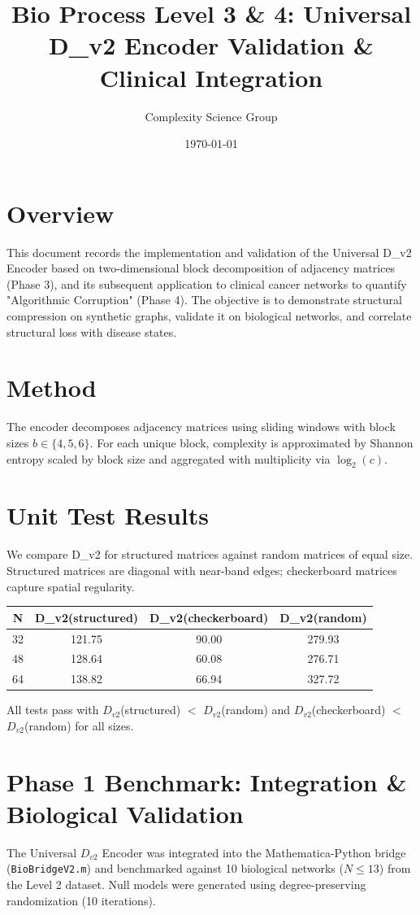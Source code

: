 \documentclass[11pt]{article}
\title{Bio Process Level 3 \& 4: Universal D\_v2 Encoder Validation \& Clinical Integration}
\author{Complexity Science Group}
\date{\today}
\begin{document}
\maketitle
\section*{Overview}
This document records the implementation and validation of the Universal D\_v2 Encoder based on two-dimensional block decomposition of adjacency matrices (Phase 3), and its subsequent application to clinical cancer networks to quantify "Algorithmic Corruption" (Phase 4). The objective is to demonstrate structural compression on synthetic graphs, validate it on biological networks, and correlate structural loss with disease states.

\section*{Method}
The encoder decomposes adjacency matrices using sliding windows with block sizes $b\in\{4,5,6\}$. For each unique block, complexity is approximated by Shannon entropy scaled by block size and aggregated with multiplicity via $\log_2(c)$.

\section*{Unit Test Results}
We compare D\_v2 for structured matrices against random matrices of equal size. Structured matrices are diagonal with near-band edges; checkerboard matrices capture spatial regularity.
\begin{center}
\begin{tabular}{cccc}
\toprule
N & D\_v2(structured) & D\_v2(checkerboard) & D\_v2(random) \\
\midrule
32 & 121.75 & 90.00 & 279.93 \\
48 & 128.64 & 60.08 & 276.71 \\
64 & 138.82 & 66.94 & 327.72 \\
\bottomrule
\end{tabular}
\end{center}
All tests pass with $D_{v2}$(structured) $<$ $D_{v2}$(random) and $D_{v2}$(checkerboard) $<$ $D_{v2}$(random) for all sizes.

\section*{Phase 1 Benchmark: Integration \& Biological Validation}
The Universal $D_{v2}$ Encoder was integrated into the Mathematica-Python bridge (\texttt{BioBridgeV2.m}) and benchmarked against 10 biological networks ($N \le 13$) from the Level 2 dataset. Null models were generated using degree-preserving randomization (10 iterations).
\end{document}
